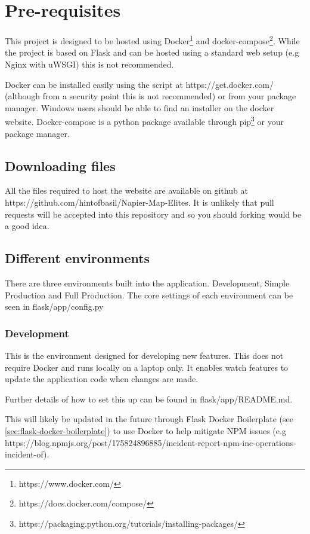 \section{Pre-requisites}

This project is designed to be hosted using Docker\footnote{https://www.docker.com/} and docker-compose\footnote{https://docs.docker.com/compose/}.  While the project is based on Flask and can be hosted using a standard web setup (e.g Nginx with uWSGI) this is not recommended.

Docker can be installed easily using the script at https://get.docker.com/ (although from a security point this is not recommended) or from your package manager.  Windows users should be able to find an installer on the docker website.  Docker-compose is a python package available through pip\footnote{https://packaging.python.org/tutorials/installing-packages/} or your package manager.

\subsection{Downloading files}

All the files required to host the website are available on github at https://github.com/hintofbasil/Napier-Map-Elites.  It is unlikely that pull requests will be accepted into this repository and so you should forking would be a good idea.

\subsection{Different environments}

There are three environments built into the application.  Development, Simple Production and Full Production.  The core settings of each environment can be seen in flask/app/config.py


\subsubsection{Development}

This is the environment designed for developing new features.  This does not require Docker and runs locally on a laptop only.  It enables watch features to update the application code when changes are made.

Further details of how to set this up can be found in flask/app/README.md.

This will likely be updated in the future through Flask Docker Boilerplate (see \ref{sec:flask-docker-boilerplate}) to use Docker to help mitigate NPM issues (e.g https://blog.npmjs.org/post/175824896885/incident-report-npm-inc-operations-incident-of).

